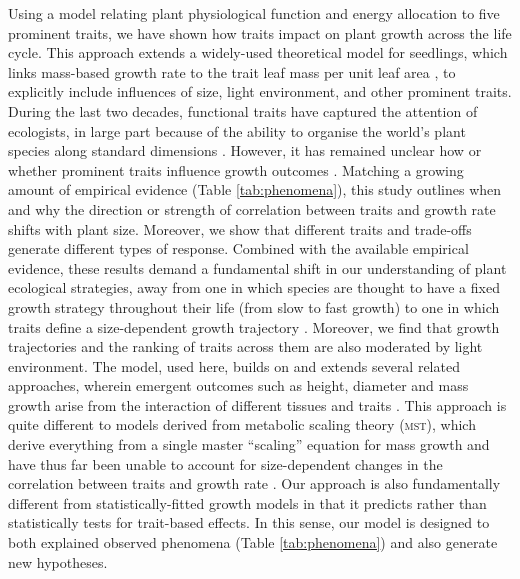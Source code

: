 \documentclass[a4paper,11pt]{article}
\begin{document}
Using a model relating plant physiological function and energy allocation to five prominent traits, we have shown how traits impact on plant growth across the life cycle. This approach extends a widely-used theoretical model for seedlings, which links mass-based growth rate to the trait leaf mass per unit leaf area \citep{Lambers-1992, Wright-2000}, to explicitly include influences of size, light environment, and other prominent traits. During the last two decades, functional traits have captured the attention of ecologists, in large part because of the ability to organise the world's plant species along standard dimensions \citep{Westoby-2002}. However, it has remained unclear how or whether prominent traits influence growth outcomes \citep{Poorter-2008, Wright-2010,Paine-2015}. Matching a growing amount of empirical evidence (Table \ref{tab:phenomena}), this study outlines when and why the direction or strength of correlation between traits and growth rate shifts with plant size. Moreover, we show that different traits and trade-offs generate different types of response. Combined with the available empirical evidence, these results demand a fundamental shift in our understanding of plant ecological strategies, away from one in which species are thought to have a fixed growth strategy throughout their life (from slow to fast growth) \citep[e.g.][]{Grime-1977, Adler-2014, Paine-2015} to one in which traits define a size-dependent growth trajectory \citep{Gibert-2016}. Moreover, we find that growth trajectories and the ranking of traits across them are also moderated by light environment. The {\plant} model, used here, builds on and extends several related approaches, wherein emergent outcomes such as height, diameter and mass growth arise from the interaction of different tissues and traits \citep[e.g.][]{Givnish-1988, Makela-1997, Moorcroft-2001}. This approach is quite different to models derived from metabolic scaling theory (\textsc{mst}), which derive everything from a single master ``scaling'' equation for mass growth and have thus far been unable to account for size-dependent changes in the correlation between traits and growth rate \citep{Enquist-1999, Enquist-2007}. Our approach is also fundamentally different from statistically-fitted growth models \citep[e.g.][]{Herault-2011, Ruger-2012, Iida-2014} in that it predicts rather than statistically tests for trait-based effects. In this sense, our model is designed to both explained observed phenomena (Table \ref{tab:phenomena}) and also generate new hypotheses.
\end{document}
